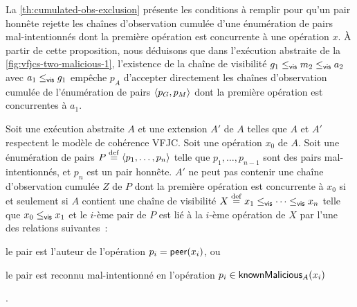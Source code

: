 La \autoref{th:cumulated-obs-exclusion} présente les conditions à remplir pour qu'un pair honnête rejette les chaînes d'observation cumulée d'une énumération de pairs mal-intentionnés dont la première opération est concurrente à une opération $x$.
À partir de cette proposition, nous déduisons que dans 
l'exécution abstraite de la \autoref{fig:vfjcs-two-malicious-1}, l'existence de la chaîne de visibilité $g_1 \viseq m_2 \viseq a_2$ avec $a_1 \viseq g_1$ empêche $p_A$ d'accepter directement les chaînes d'observation cumulée de l'énumération de pairs $\tuple*{p_G, p_M}$ dont la première opération est concurrentes à $a_1$.

\begin{proposition}\label{th:cumulated-obs-exclusion}
Soit une exécution abstraite $A$ et une extension $A'$ de $A$ telles que $A$ et $A'$ respectent le modèle de cohérence \ac{VFJC}.
Soit une opération $x_0$ de $A$.
Soit une énumération de pairs $P \defeq \tuple*{p_1, \dotsc ,p_n}$ telle que $p_1, \dotsc, p_{n-1}$ sont des pairs mal-intentionnés, et $p_n$ est un pair honnête.
$A'$ ne peut pas contenir une chaîne d'observation cumulée $Z$ de $P$ dont la première opération est concurrente à $x_0$ si et seulement si $A$ contient une chaîne de visibilité $X \defeq x_1 \viseq \dotsb \viseq x_n$ telle que $x_0 \viseq x_1$ et le $i$-ème pair de $P$ est lié à la $i$-ème opération de $X$ par l'une des relations suivantes~: \begin{inlinelist}
    \item le pair est l'auteur de l'opération $p_i = \trm{peer}(x_i)$, ou
    \item le pair est reconnu mal-intentionné en l'opération $p_i \in \trm{knownMalicious}_A(x_i)$
\end{inlinelist}.
\end{proposition}

